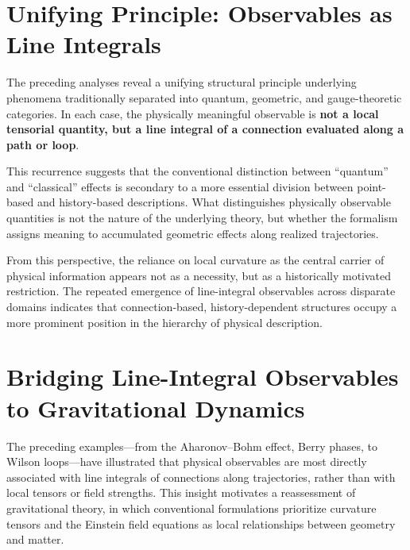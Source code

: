 \documentclass[%
 reprint,
 amsmath,amssymb,
 aps,
 prb,
]{revtex4-2}
\numberwithin{equation}{section}
\begin{document}
\section{Unifying Principle: Observables as Line Integrals}
\label{sec:unifying_line_integral_principle}

The preceding analyses reveal a unifying structural principle underlying phenomena traditionally separated into quantum, geometric, and gauge-theoretic categories. In each case, the physically meaningful observable is \textbf{not a local tensorial quantity, but a line integral of a connection evaluated along a path or loop}.

This recurrence suggests that the conventional distinction between ``quantum'' and ``classical'' effects is secondary to a more essential division between point-based and history-based descriptions. What distinguishes physically observable quantities is not the nature of the underlying theory, but whether the formalism assigns meaning to accumulated geometric effects along realized trajectories.

From this perspective, the reliance on local curvature as the central carrier of physical information appears not as a necessity, but as a historically motivated restriction. The repeated emergence of line-integral observables across disparate domains indicates that connection-based, history-dependent structures occupy a more prominent position in the hierarchy of physical description.


\section{Bridging Line-Integral Observables to Gravitational Dynamics}
\label{sec:bridge_gravity}

The preceding examples—from the Aharonov--Bohm effect, Berry phases, to Wilson loops—have illustrated that physical observables are most directly associated with line integrals of connections along trajectories, rather than with local tensors or field strengths. This insight motivates a reassessment of gravitational theory, in which conventional formulations prioritize curvature tensors and the Einstein field equations as local relationships between geometry and matter.
\end{document}
